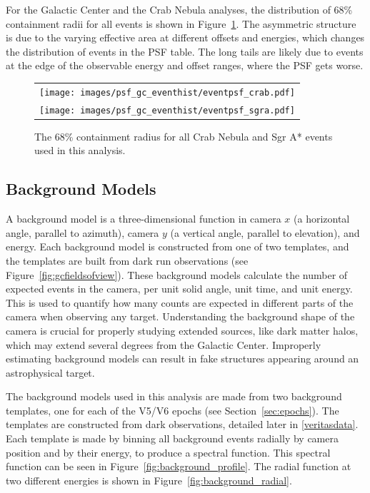     For the Galactic Center and the Crab Nebula analyses, the distribution of 68\% containment radii for all events is shown in Figure~\ref{fig:gc_psf_hist}.
    The asymmetric structure is due to the varying effective area at different offsets and energies, which changes the distribution of events in the PSF table.
    The long tails are likely due to events at the edge of the observable energy and offset ranges, where the PSF gets worse.

    \begin{figure}[!hb]
      \centering
      \begin{tabular}{c}
        \texttt{[image: images/psf\_gc\_eventhist/eventpsf\_crab.pdf]} \\
        \texttt{[image: images/psf\_gc\_eventhist/eventpsf\_sgra.pdf]}
      \end{tabular}
      \caption[Crab and Galactic Center Event PSFs]{
        The 68\% containment radius for all Crab Nebula and Sgr A* events used in this analysis.
      }
      \label{fig:gc_psf_hist}
    \end{figure}
  
  \FloatBarrier
  
  \subsection{Background Models}\label{background_production}
  
    A background model is a three-dimensional function in camera $x$ (a horizontal angle, parallel to azimuth), camera $y$ (a vertical angle, parallel to elevation), and energy.
    Each background model is constructed from one of two templates, and the templates are built from dark run observations (see Figure~\ref{fig:gcfieldsofview}).
    These background models calculate the number of expected events in the camera, per unit solid angle, unit time, and unit energy.
    This is used to quantify how many counts are expected in different parts of the camera when observing any target.
    Understanding the background shape of the camera is crucial for properly studying extended sources, like dark matter halos, which may extend several degrees from the Galactic Center.
    Improperly estimating background models can result in fake structures appearing around an astrophysical target.
    
    The background models used in this analysis are made from two background templates, one for each of the V5/V6 epochs (see Section~\ref{sec:epochs}).
    The templates are constructed from dark observations, detailed later in \ref{veritasdata}.
    Each template is made by binning all background events radially by camera position and by their energy, to produce a spectral function.
    This spectral function can be seen in Figure~\ref{fig:background_profile}.
    The radial function at two different energies is shown in Figure~\ref{fig:background_radial}.

